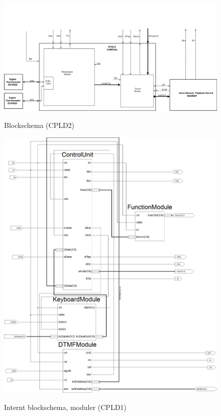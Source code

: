 \documentclass[a4paper,11pt]{article}
\begin{document}
		\begin{figure}[H]
		  \centering
		      \includegraphics[scale=0.40, angle=90]{BlockDiagramCPLD2.png}
			\label{fig:BlockDiagram2}
		  	\caption{Blockschema (CPLD2)}
		\end{figure}
	
		\begin{figure}[H]
		  \centering
		      \includegraphics[scale=0.30, angle=0]{Xilinx_CPLD1.png}
			\label{fig:BlockDiagram2}
		  	\caption{Internt blockschema, moduler (CPLD1)}
		\end{figure}
	
\end{document}
